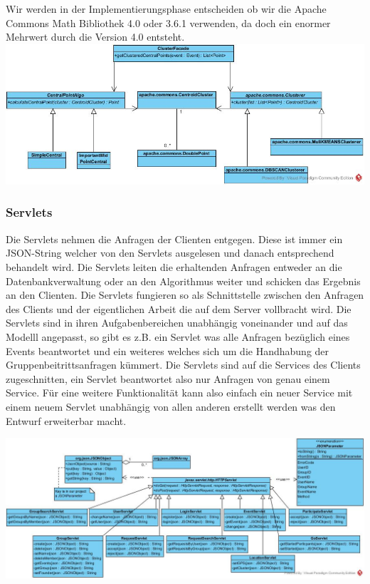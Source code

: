 Wir werden in der Implementierungsphase entscheiden ob wir die Apache Commons Math Bibliothek 4.0 oder 3.6.1 verwenden, da doch ein enormer Mehrwert durch die Version 4.0 entsteht.
  \newline
	\includegraphics[width=1.1\textwidth]{AlgorithmClassDiagram.jpg}

	\subsubsection{Servlets}

	Die Servlets nehmen die Anfragen der Clienten entgegen. Diese ist immer ein JSON-String welcher von den Servlets ausgelesen und danach entsprechend behandelt wird. Die Servlets leiten die erhaltenden Anfragen entweder an die Datenbankverwaltung oder an den Algorithmus weiter und schicken das Ergebnis an den Clienten.
Die Servlets fungieren so als Schnittstelle zwischen den Anfragen des Clients und der eigentlichen Arbeit die auf dem Server vollbracht wird. 
Die Servlets sind in ihren Aufgabenbereichen unabhängig voneinander und auf das Modelll angepasst, so gibt es z.B. ein Servlet was alle Anfragen bezüglich eines Events beantwortet und ein weiteres welches sich um die Handhabung der Gruppenbeitrittsanfragen kümmert.
Die Servlets sind auf die Services des Clients zugeschnitten, ein Servlet beantwortet also nur Anfragen von genau einem Service.
Für eine weitere Funktionalität kann also einfach ein neuer Service mit einem neuem Servlet unabhängig von allen anderen erstellt werden was den Entwurf erweiterbar macht.   

\includegraphics[width=1.1\textwidth]{ServletsClassDiagram.jpg}


